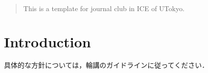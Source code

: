 \documentclass[a4j,twocolumn,10pt,uplatex]{ujarticle}
\author{遠藤 勇樹}
\affiliation{電子情報学専攻　博士課程１年　xx-xxxxxx}
\date{2021/06/25}
\begin{document}
\maketitle

\begin{abstract}
This is a template for journal club in ICE of UTokyo.

\end{abstract}

\section{Introduction}
具体的な方針については，輪講のガイドラインに従ってください．

% 
\end{document}
